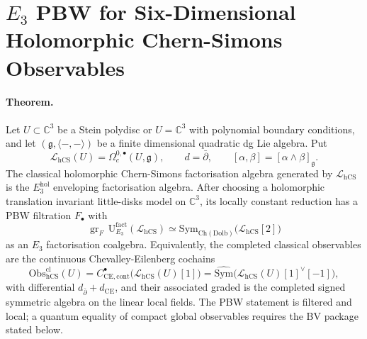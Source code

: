 
\providecommand{\Obs}{\mathrm{Obs}}
\providecommand{\hCS}{\mathrm{hCS}}
\providecommand{\Ch}{\mathrm{Ch}}
\providecommand{\Dolb}{\mathrm{Dolb}}
\providecommand{\Conf}{\mathrm{Conf}}
\providecommand{\Fact}{\mathrm{Fact}}
\providecommand{\Sym}{\mathrm{Sym}}
\providecommand{\Lie}{\mathrm{Lie}}
\providecommand{\Free}{\mathrm{Free}}
\providecommand{\CE}{\mathrm{CE}}
\providecommand{\Prim}{\mathrm{Prim}}
\providecommand{\prim}{\mathrm{prim}}
\providecommand{\dbar}{\bar\partial}
\providecommand{\Opn}{\mathrm{Opn}}
\providecommand{\kch}{\kappa_{\mathrm{ch}}}
\providecommand{\kcat}{\kappa_{\mathrm{cat}}}
\providecommand{\kBKM}{\kappa_{\mathrm{BKM}}}
\providecommand{\kfib}{\kappa_{\mathrm{fiber}}}
\providecommand{\kanom}{\kappa_{\mathrm{anom}}}
\providecommand{\Ran}{\mathrm{Ran}}
\providecommand{\CoHA}{\mathrm{CoHA}}
\providecommand{\C}{\mathbb{C}}
\providecommand{\R}{\mathbb{R}}
\providecommand{\Z}{\mathbb{Z}}
\providecommand{\cO}{\mathcal{O}}
\providecommand{\cW}{\mathcal{W}}
\providecommand{\fgl}{\mathfrak{gl}}
\providecommand{\fg}{\mathfrak{g}}
\providecommand{\gln}{\widehat{\mathfrak{gl}}_1}
\providecommand{\UE}{\mathrm{U}_{E_n}}
\providecommand{\UEthree}{\mathrm{U}_{E_3}}
\providecommand{\PhiFA}{\Phi^{\mathrm{FA}}}
\providecommand{\SpCh}{\mathrm{Sp}^{\mathrm{ch}}}
\providecommand{\Rep}{\mathrm{Rep}}
\providecommand{\Zchder}{Z^{\mathrm{der}}_{\mathrm{ch}}}

\section*{$E_3$ PBW for Six-Dimensional Holomorphic Chern-Simons Observables}

\paragraph{Theorem.}
Let \(U\subset \C^3\) be a Stein polydisc or \(U=\C^3\) with polynomial
boundary conditions, and let \((\fg,\langle-,-\rangle)\) be a finite
dimensional quadratic dg Lie algebra. Put
\[
  \mathscr L_{\hCS}(U)=\Omega^{0,\bullet}_c(U,\fg),
  \qquad
  d=\dbar,
  \qquad
  [\alpha,\beta]=[\alpha\wedge\beta]_{\fg}.
\]
The classical holomorphic Chern-Simons factorisation algebra generated by
\(\mathscr L_{\hCS}\) is the \(E_3^{\mathrm{hol}}\) enveloping
factorisation algebra. After choosing a holomorphic translation invariant
little-disks model on \(\C^3\), its locally constant reduction has a PBW
filtration \(F_\bullet\) with
\[
  \operatorname{gr}_F\,
  \mathrm U^{\mathrm{fact}}_{E_3}(\mathscr L_{\hCS})
  \simeq
  \Sym_{\Ch(\Dolb)}\!\bigl(\mathscr L_{\hCS}[2]\bigr)
\]
as an \(E_3\) factorisation coalgebra. Equivalently, the completed
classical observables are the continuous Chevalley-Eilenberg cochains
\[
  \Obs^{\mathrm{cl}}_{\hCS}(U)
  =
  C^\bullet_{\CE,\mathrm{cont}}\bigl(\mathscr L_{\hCS}(U)[1]\bigr)
  =
  \widehat{\Sym}\bigl(\mathscr L_{\hCS}(U)[1]^\vee[-1]\bigr),
\]
with differential \(d_{\dbar}+d_{\mathrm{CE}}\), and their associated
graded is the completed signed symmetric algebra on the linear local
fields. The PBW statement is filtered and local; a quantum equality of
compact global observables requires the BV package stated below.

